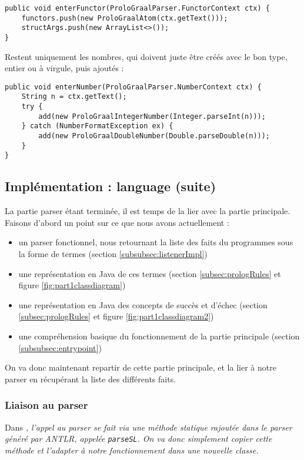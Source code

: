 \documentclass[../report.tex]{subfiles}
\begin{document}
\begin{verbatim}
public void enterFunctor(ProloGraalParser.FunctorContext ctx) {
    functors.push(new ProloGraalAtom(ctx.getText()));
    structArgs.push(new ArrayList<>());
}
\end{verbatim}
Restent uniquement les nombres, qui doivent juste être créés avec le bon type, entier ou à virgule, puis ajoutés :
\begin{verbatim}
public void enterNumber(ProloGraalParser.NumberContext ctx) {
    String n = ctx.getText();
    try {
        add(new ProloGraalIntegerNumber(Integer.parseInt(n)));
    } catch (NumberFormatException ex) {
        add(new ProloGraalDoubleNumber(Double.parseDouble(n)));
    }
}
\end{verbatim}
\subsection{Implémentation : language (suite)}
La partie parser étant terminée, il est temps de la lier avec la partie principale. Faisons d'abord un point sur ce que nous avons actuellement :
\begin{itemize}
    \item un parser fonctionnel, nous retournant la liste des faits du programmes sous la forme de termes (section \ref{subsubsec:listenerImpl})
    \item une représentation en Java de ces termes (section \ref{subsec:prologRules} et figure \ref{fig:part1classdiagram})
    \item une représentation en Java des concepts de succès et d'échec (section \ref{subsec:prologRules} et figure \ref{fig:part1classdiagram2})
    \item une compréhension basique du fonctionnement de la partie principale (section \ref{subsubsec:entrypoint})
\end{itemize}
On va donc maintenant repartir de cette partie principale, et la lier à notre parser en récupérant la liste des différents faits. 
\subsubsection{Liaison au parser}
Dans \sl{}, l'appel au parser se fait via une méthode statique rajoutée dans le parser généré par ANTLR, appelée \texttt{parseSL}. On va donc simplement copier cette méthode et l'adapter à notre fonctionnement dans une nouvelle classe.
\end{document}
